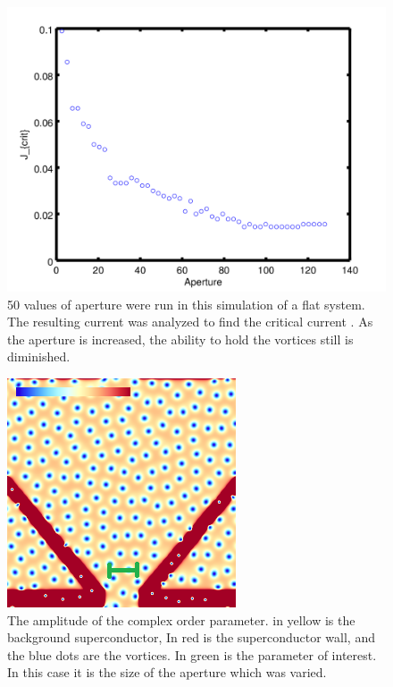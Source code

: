 \begin{figure}[htbp]
\begin{center}
\includegraphics[scale=.50]{flatAperture.png}
\caption{ 50 values of aperture were run in this simulation of a flat system. The resulting current was analyzed to find the critical current . As the aperture is increased, the ability to hold the vortices still is diminished. }
\label{flatScan}
\end{center}
\end{figure}


\begin{figure}[htbp]
\begin{center}
\includegraphics[scale=.50]{normalX.png}
\caption{ The amplitude of the complex order parameter. in yellow is the background superconductor, In red is the superconductor wall, and the blue dots are the vortices. In green is the parameter of interest. In this case it is the size of the aperture which was varied. }
\label{normalX}
\end{center}
\end{figure}

